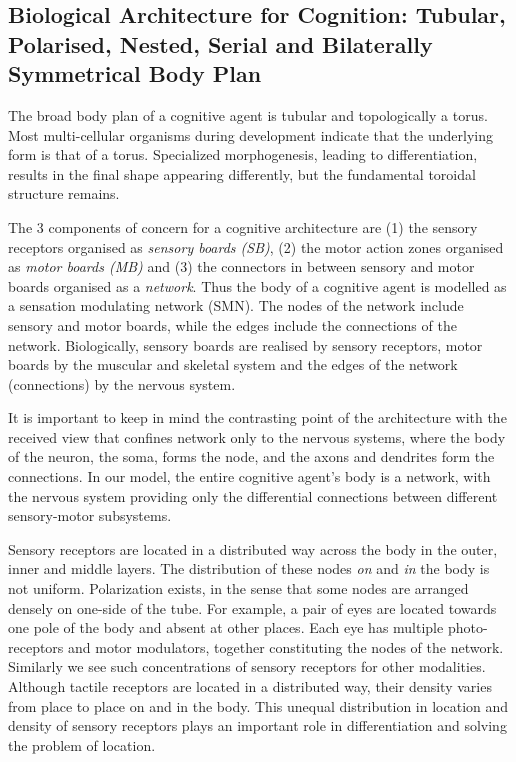 \subsection{Biological Architecture for Cognition: Tubular, Polarised, Nested, Serial and Bilaterally Symmetrical Body Plan}

The broad body plan of a cognitive agent is tubular and topologically a torus. Most multi-cellular organisms during development indicate that the underlying form is that of a torus. Specialized morphogenesis, leading to differentiation, results in the final shape appearing differently, but the fundamental toroidal structure remains.

The 3 components of concern for a cognitive architecture are (1) the sensory receptors organised as \textit{sensory boards (SB)}, (2) the motor action zones organised as \textit{motor boards (MB)} and (3) the connectors in between sensory and motor boards organised as a \textit{network}. Thus the body of a cognitive agent is modelled as a sensation modulating network (SMN). The nodes of the network include sensory and motor boards, while the edges include the connections of the network. Biologically, sensory boards are realised by sensory receptors, motor boards by the muscular and skeletal system and the edges of the network (connections) by the nervous system.

It is important to keep in mind the contrasting point of the architecture with the received view that confines network only to the nervous systems, where the body of the neuron, the soma, forms the node, and the axons and dendrites form the connections. In our model, the entire cognitive agent's body is a network, with the nervous system providing only the differential connections between different sensory-motor subsystems. 

Sensory receptors are located in a distributed way across the body in the outer, inner and middle layers. The distribution of these nodes \textit{on} and \textit{in} the body is not uniform. Polarization exists, in the sense that some nodes are arranged densely on one-side of the tube. For example, a pair of eyes are located towards one pole of the body and absent at other places. Each eye has multiple photo-receptors and motor modulators, together constituting the nodes of the network. Similarly we see such concentrations of sensory receptors for other modalities. Although tactile receptors are located in a distributed way, their density varies from place to place on and in the body. This unequal distribution in location and density of sensory receptors plays an important role in differentiation and solving the problem of location.

